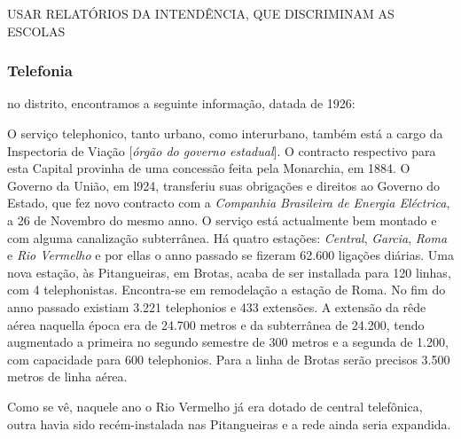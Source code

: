 USAR RELATÓRIOS DA INTENDÊNCIA, QUE DISCRIMINAM AS ESCOLAS

\subsubsection{Telefonia} 

no distrito, encontramos a seguinte informação, datada de 1926:

\begin{citacao}
O serviço telephonico, tanto urbano, como interurbano, também está a cargo da Inspectoria de Viação [\textit{órgão do governo estadual}].
O contracto respectivo para esta Capital provinha de uma concessão feita pela Monarchia, em 1884.
O Governo da União, em l924, transferiu suas obrigações e direitos ao Governo do Estado, que fez novo contracto com a \textit{Companhia Brasileira de Energia Eléctrica}, a 26 de Novembro do mesmo anno.
O serviço está actualmente bem montado e com alguma canalização subterrânea.
Há quatro estações: \textit{Central}, \textit{Garcia}, \textit{Roma} e \textit{Rio Vermelho} e por ellas o anno passado se fizeram 62.600 ligações diárias.
Uma nova estação, às Pitangueiras, em Brotas, acaba de ser installada para 120 linhas, com 4 telephonistas.
Encontra-se em remodelação a estação de Roma.
No fim do anno passado existiam 3.221 telephonios e 433 extensões.
A extensão da rêde aérea naquella época era de 24.700 metros e da subterrânea de 24.200, tendo augmentado a primeira no segundo semestre de 300 metros e a segunda
de 1.200, com capacidade para 600 telephonios.
Para a linha de Brotas serão precisos 3.500 metros de linha aérea. \cite[pp.~266-267]{bahia_rpe_1926}
\end{citacao}

Como se vê, naquele ano o Rio Vermelho já era dotado de central telefônica, outra havia sido recém-instalada nas Pitangueiras e a rede ainda seria expandida.